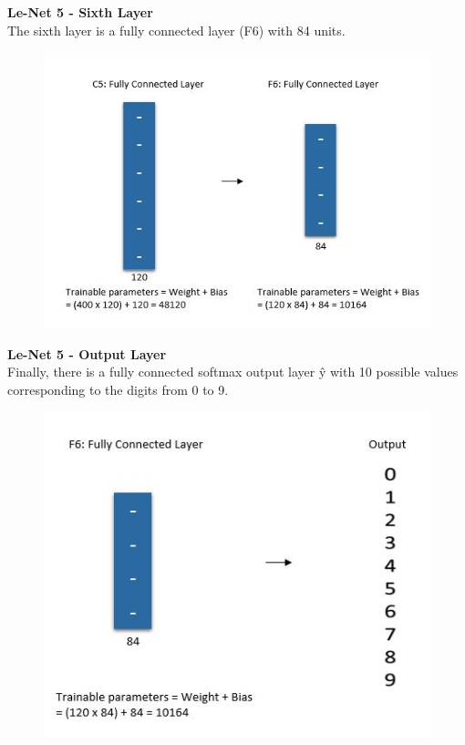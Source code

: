 \documentclass[10pt, compress]{beamer}
\begin{document}
\begin{frame}
  \vspace{0.6cm}
  \textbf{Le-Net 5 - Sixth Layer} \\
  The sixth layer is a fully connected layer (F6) with 84 units.
  \begin{figure}
    \includegraphics[width=.75\linewidth]{imgs/cnn/LeNet_Layer6}
  \end{figure}
\end{frame}

\begin{frame}
  \vspace{0.6cm}
  \textbf{Le-Net 5 - Output Layer} \\
  Finally, there is a fully connected softmax output layer ŷ with 10 possible values corresponding to the digits from 0 to 9.
  \begin{figure}
    \includegraphics[width=.65\linewidth]{imgs/cnn/LeNet_Output_Layer}
  \end{figure}
\end{frame}
\end{document}

